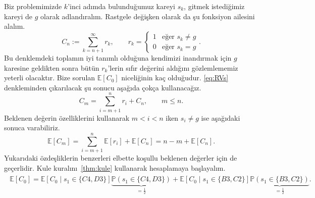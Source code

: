 Biz problemimizde $k$'inci ad{\i}mda bulundu\u{g}umuz kareyi $s_k$, gitmek
istedi\u{g}imiz kareyi de $g$ olarak adland{\i}ral{\i}m. Rastgele
de\u{g}i\c{s}ken olarak da \c{s}u fonksiyon ailesini alal{\i}m.
\begin{equation}
    C_n := \sum_{k=n+1}^\infty r_k, \qquad r_k = 
\begin{cases}
    1 & \mbox{e\u{g}er } s_k \neq g \\
    0 & \mbox{e\u{g}er } s_k = g
\end{cases}.
\label{eq:RVs}
\end{equation}
Bu denklemdeki toplam{\i}n iyi tan{\i}ml{\i} oldu\u{g}una kendimizi
inand{\i}rmak i\c{c}in $g$ karesine geldikten sonra b\"{u}t\"{u}n $r_k$'lerin
s{\i}f{\i}r de\u{g}erini ald{\i}\u{g}{\i}n{\i} g\"{o}zlemlememiz yeterli
olacakt{\i}r. Bize sorulan $\mathbb{E}[C_0]$ niceli\u{g}inin ka\c{c}
oldu\u{g}udur. \eqref{eq:RVs} denkleminden \c{c}{\i}kar{\i}lacak \c{s}u sonucu
a\c{s}a\u{g}{\i}da \c{c}ok\c{c}a kullanaca\u{g}{\i}z.
\begin{equation*} 
    C_m = \sum_{i=m+1}^n r_i + C_n, \qquad m \leq n.
\end{equation*}
Beklenen de\u{g}erin \"{o}zelliklerini kullanarak $m < i < n$ iken $s_i \neq g$
ise a\c{s}a\u{g}{\i}daki sonuca varabiliriz.
\begin{equation*} 
    \mathbb{E}[C_m] = \sum_{i=m+1}^n \mathbb{E}[r_i] + \mathbb{E}[C_n] = n-m + \mathbb{E}[C_n].
\end{equation*}
Yukar{\i}daki \"{o}zde\c{s}liklerin benzerleri elbette ko\c{s}ullu beklenen
de\u{g}erler i\c{c}in de ge\c{c}erlidir. Kule kural{\i}n{\i}~\ref{thm:kule}
kullanarak hesaplamaya ba\c{s}layal{\i}m.
%
\vspace{-0mm}
\begin{align}
    \begin{split}
    \mathbb{E}[C_0] = \mathbb{E}\left[ C_0 \mid s_1 \in \{C4, D3\} \right] 
    \underbrace{\mathbb{P}(s_1 \in \{C4, D3\})}_{=\frac{1}{2}} +
    \mathbb{E}\left[ C_0 \mid s_1 \in \{B3, C2\} 
    \right] \underbrace{\mathbb{P}(s_1 \in \{B3, C2\})}_{=\frac{1}{2}}.
    \end{split}
    \label{eq:tower1}
\end{align}
